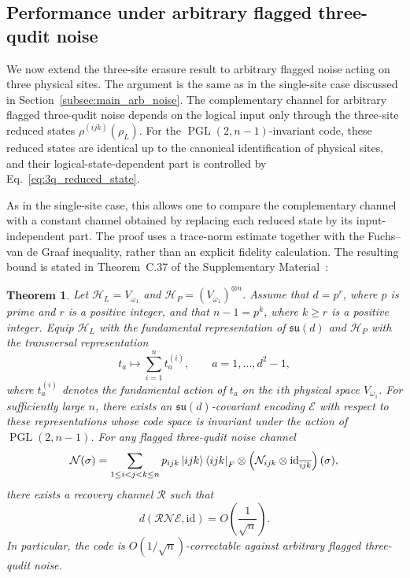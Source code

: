 \documentclass[10pt,twocolumn,superscriptaddress,aps,amsmath,amssymb,citeautoscript,floatfix,prx,longbibliography]{revtex4-2}
\newtheorem{theorem}{Theorem}
\theoremstyle{plain}
\theoremstyle{plain}
\theoremstyle{plain}
\theoremstyle{plain}
\theoremstyle{plain}
\theoremstyle{plain}
\begin{document}
\subsection{Performance under arbitrary flagged three-qudit noise}\label{subsec:main_arb_3_noise}

We now extend the three-site erasure result to arbitrary flagged noise acting on three physical sites. The argument is the same as in the single-site case discussed in Section~\ref{subsec:main_arb_noise}. The complementary channel for arbitrary flagged three-qudit noise depends on the logical input only through the three-site reduced states $\rho^{(ijk)}(\rho_L)$. For the $\operatorname{PGL}(2,n-1)$-invariant code, these reduced states are identical up to the canonical identification of physical sites, and their logical-state-dependent part is controlled by Eq.~\eqref{eq:3q_reduced_state}.

As in the single-site case, this allows one to compare the complementary channel with a constant channel obtained by replacing each reduced state by its input-independent part. The proof uses a trace-norm estimate together with the Fuchs--van de Graaf inequality, rather than an explicit fidelity calculation. The resulting bound is stated in Theorem~C.37 of the Supplementary Material~\cite{SuppMat}:

\begin{theorem}
Let $\mathcal H_L=V_{\omega_1}$ and $\mathcal H_P=(V_{\omega_1})^{\otimes n}$. Assume that $d=p^r$, where $p$ is prime and $r$ is a positive integer, and that $n-1=p^k$, where $k\ge r$ is a positive integer. Equip $\mathcal H_L$ with the fundamental representation of $\mathfrak{su}(d)$ and $\mathcal H_P$ with the transversal representation
$$
t_a
\longmapsto
\sum_{i=1}^n t_a^{(i)},
\qquad
a=1,\ldots,d^2-1,
$$
where $t_a^{(i)}$ denotes the fundamental action of $t_a$ on the $i$th physical space $V_{\omega_1}$. For sufficiently large $n$, there exists an $\mathfrak{su}(d)$-covariant encoding $\mathcal E$ with respect to these representations whose code space is invariant under the action of $\operatorname{PGL}(2,n-1)$. For any flagged three-qudit noise channel
$$
\mathcal N(\sigma)
=
\sum_{1\le i<j<k\le n}
p_{ijk}
\ket{ijk}\bra{ijk}_F
\otimes
\left(
\mathcal N_{ijk}\otimes\mathrm{id}_{\overline{ijk}}
\right)(\sigma),
$$
there exists a recovery channel $\mathcal R$ such that
$$
d(\mathcal R\mathcal N\mathcal E,\mathrm{id})
=
O\left(\frac{1}{\sqrt n}\right).
$$
In particular, the code is $O(1/\sqrt n)$-correctable against arbitrary flagged three-qudit noise.
\end{theorem}
\end{document}
